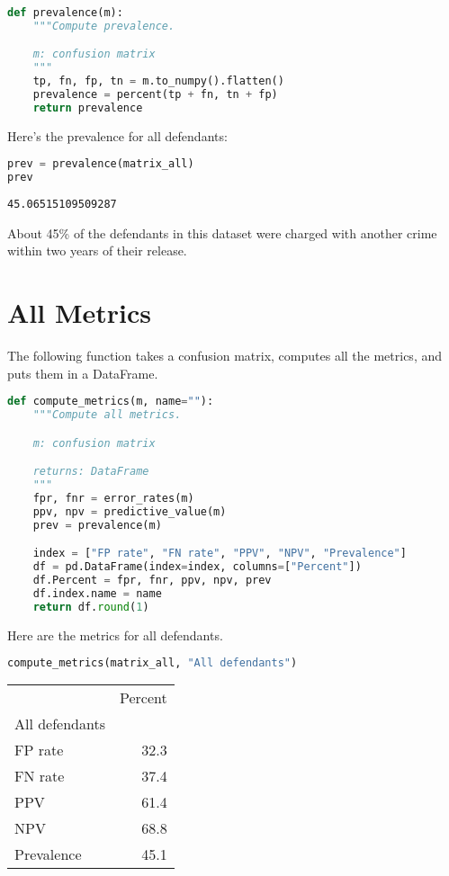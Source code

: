 \begin{lstlisting}[language=Python,style=source]
def prevalence(m):
    """Compute prevalence.

    m: confusion matrix
    """
    tp, fn, fp, tn = m.to_numpy().flatten()
    prevalence = percent(tp + fn, tn + fp)
    return prevalence
\end{lstlisting}

Here's the prevalence for all defendants:

\begin{lstlisting}[language=Python,style=source]
prev = prevalence(matrix_all)
prev
\end{lstlisting}

\begin{lstlisting}[style=output]
45.06515109509287
\end{lstlisting}

About 45\% of the defendants in this dataset were charged with another
crime within two years of their release.

\section{All Metrics}\label{all-metrics}

The following function takes a confusion matrix, computes all the
metrics, and puts them in a DataFrame.

\begin{lstlisting}[language=Python,style=source]
def compute_metrics(m, name=""):
    """Compute all metrics.

    m: confusion matrix

    returns: DataFrame
    """
    fpr, fnr = error_rates(m)
    ppv, npv = predictive_value(m)
    prev = prevalence(m)

    index = ["FP rate", "FN rate", "PPV", "NPV", "Prevalence"]
    df = pd.DataFrame(index=index, columns=["Percent"])
    df.Percent = fpr, fnr, ppv, npv, prev
    df.index.name = name
    return df.round(1)
\end{lstlisting}

Here are the metrics for all defendants.

\begin{lstlisting}[language=Python,style=source]
compute_metrics(matrix_all, "All defendants")
\end{lstlisting}

\begin{tabular}{lr}
\midrule
 & Percent \\
All defendants &  \\
\midrule
FP rate & 32.3 \\
FN rate & 37.4 \\
PPV & 61.4 \\
NPV & 68.8 \\
Prevalence & 45.1 \\
\midrule
\end{tabular}

